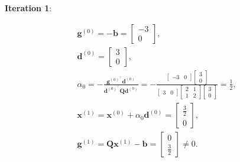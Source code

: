 \textbf{Iteration 1}:

\[
	\begin{aligned}
		& \boldsymbol{g}^{(0)}=-\boldsymbol{b}=\left[\begin{array}{c}
			-3 \\
			0
		\end{array}\right], \\
		& \boldsymbol{d}^{(0)}=\left[\begin{array}{l}
			3 \\
			0
		\end{array}\right] \text {, } \\
		& \alpha_{0}=-\frac{\boldsymbol{g}^{(0)^{\top}} \boldsymbol{d}^{(0)}}{\boldsymbol{d}^{(0)^{\top}} \boldsymbol{Q} \boldsymbol{d}^{(0)}}=-\frac{\left[\begin{array}{ll}
				-3 & 0
			\end{array}\right]\left[\begin{array}{l}
				3 \\
				0
			\end{array}\right]}{\left[\begin{array}{ll}
				3 & 0
			\end{array}\right]\left[\begin{array}{ll}
				2 & 1 \\
				1 & 2
			\end{array}\right]\left[\begin{array}{l}
				3 \\
				0
			\end{array}\right]}=\frac{1}{2}, \\
		& \boldsymbol{x}^{(1)}=\boldsymbol{x}^{(0)}+\alpha_{0} \boldsymbol{d}^{(0)}=\left[\begin{array}{l}
			\frac{3}{2} \\
			0
		\end{array}\right] \text {, } \\
		& \boldsymbol{g}^{(1)}=\boldsymbol{Q} \boldsymbol{x}^{(1)}-\boldsymbol{b}=\left[\begin{array}{l}
			0 \\
			\frac{3}{2}
		\end{array}\right] \neq 0 .
	\end{aligned}
\]

